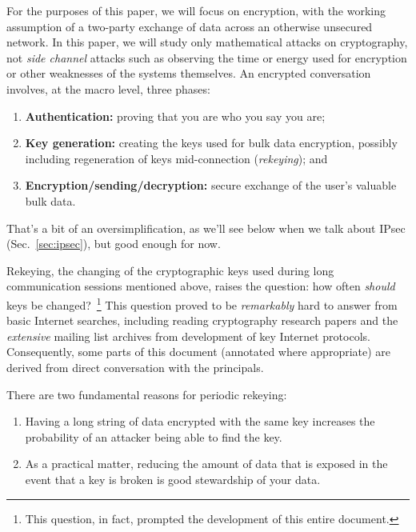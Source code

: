 For the purposes of this paper, we will focus on encryption, with the
working assumption of a two-party exchange of data across an otherwise
unsecured network.  In this paper, we will study only mathematical
attacks on cryptography, not \emph{side channel} attacks such as
observing the time or energy used for encryption or other weaknesses
of the systems themselves.  An encrypted conversation involves, at the
macro level, three phases:

\begin{enumerate}
\item {\bf Authentication:} proving that you are who you say you are;
\item {\bf Key generation:} creating the keys used for bulk data encryption,
  possibly including regeneration of keys mid-connection
  (\emph{rekeying}); and
\item {\bf Encryption/sending/decryption:} secure exchange of the
  user's valuable bulk data.
\end{enumerate}

That's a bit of an oversimplification, as we'll see below when we talk
about IPsec (Sec.~\ref{sec:ipsec}), but good enough for now.

Rekeying, the changing of the cryptographic keys used during long
communication sessions mentioned above, raises the question: how often
\emph{should} keys be changed?~\footnote{This question, in fact,
  prompted the development of this entire document.}  This question
proved to be \emph{remarkably} hard to answer from basic Internet
searches, including reading cryptography research papers and the
\emph{extensive} mailing list archives from development of key
Internet protocols.  Consequently, some parts of this document
(annotated where appropriate) are derived from direct conversation
with the principals.

There are two fundamental reasons for periodic rekeying:

\begin{enumerate}
\item Having a long string of data encrypted with the same key increases
the probability of an attacker being able to find the key.
\item As a practical matter, reducing the amount of data that is exposed
in the event that a key is broken is good stewardship of your data.
\end{enumerate}

